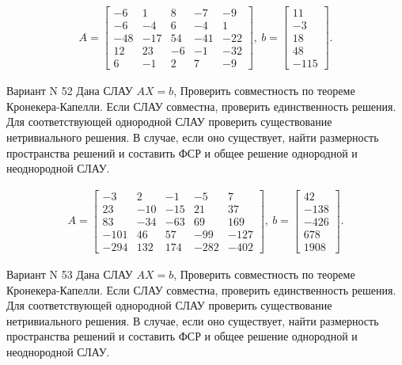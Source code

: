 \documentclass[11pt]{report}
\begin{document}
\begin{align*}
 A = \left[\begin{matrix}-6 & 1 & 8 & -7 & -9\\-6 & -4 & 6 & -4 & 1\\-48 & -17 & 54 & -41 & -22\\12 & 23 & -6 & -1 & -32\\6 & -1 & 2 & 7 & -9\end{matrix}\right],
\ b = \left[\begin{matrix}11\\-3\\18\\48\\-115\end{matrix}\right]. 
 \end{align*}

Вариант N 52
Дана СЛАУ $AX = b$,
Проверить совместность по теореме Кронекера-Капелли. Если СЛАУ совместна, проверить единственность решения.
Для соответствующей однородной СЛАУ проверить существование нетривиального решения. В случае, если оно существует,
найти размерность пространства решений и составить ФСР и общее решение однородной  и неоднородной СЛАУ.


\begin{align*}
 A = \left[\begin{matrix}-3 & 2 & -1 & -5 & 7\\23 & -10 & -15 & 21 & 37\\83 & -34 & -63 & 69 & 169\\-101 & 46 & 57 & -99 & -127\\-294 & 132 & 174 & -282 & -402\end{matrix}\right],
\ b = \left[\begin{matrix}42\\-138\\-426\\678\\1908\end{matrix}\right]. 
 \end{align*}

Вариант N 53
Дана СЛАУ $AX = b$,
Проверить совместность по теореме Кронекера-Капелли. Если СЛАУ совместна, проверить единственность решения.
Для соответствующей однородной СЛАУ проверить существование нетривиального решения. В случае, если оно существует,
найти размерность пространства решений и составить ФСР и общее решение однородной  и неоднородной СЛАУ.
\end{document}
